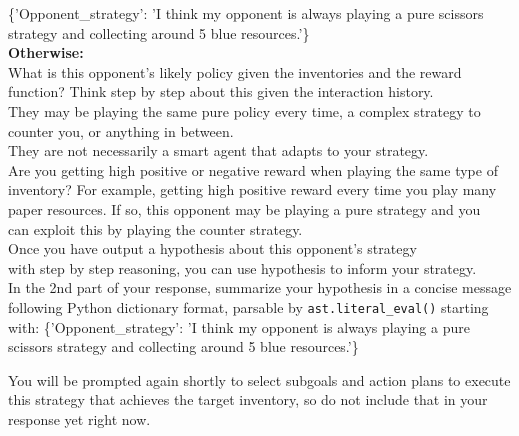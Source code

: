 \documentclass{article} %
\begin{document}
\begin{tcolorbox}[
    title={\small \textbf{ToM Module User Message 2}},
    width=\linewidth, %
    fontupper=\fontsize{9pt}{11pt}\selectfont\ttfamily %
]
\{'Opponent\_strategy': 'I think my opponent is always playing a pure scissors strategy and collecting around 5 blue resources.'\}\\
\textbf{Otherwise:}\\
What is this opponent's likely policy given the inventories and the reward \\
function? Think step by step about this given the interaction history.\\
They may be playing the same pure policy every time, a complex strategy to \\ 
counter you, or anything in between.\\
They are not necessarily a smart agent that adapts to your strategy.\\
Are you getting high positive or negative reward when playing the same type of inventory? For example, getting high positive reward every time you play many \\ paper resources. If so, this opponent may be playing a pure strategy and you \\ can 
exploit this by playing the counter strategy.\\
Once you have output a hypothesis about this opponent's strategy \\ with step by step reasoning, you can use hypothesis to inform your strategy.\\
In the 2nd part of your response, summarize your hypothesis in a concise message following Python dictionary format, parsable by \texttt{ast.literal\_eval()} starting with:
\{'Opponent\_strategy': 'I think my opponent is always playing a pure scissors strategy and collecting around 5 blue resources.'\}

You will be prompted again shortly to select subgoals and action plans to execute this strategy that achieves the target inventory, so do not include that in your response yet right now.

\end{tcolorbox}
\end{document}
